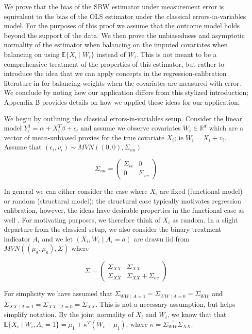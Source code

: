 \documentclass[12pt]{article}
\begin{document}
We prove that the bias of the SBW estimator under measurement error is equivalent to the bias of the OLS estimator under the classical errors-in-variables model. For the purposes of this proof we assume that the outcome model holds beyond the support of the data. We then prove the unbiasedness and asymptotic normality of the estimator when balancing on the imputed covariates when balancing on using $\mathbb{E}\{X_i \mid W_i\}$ instead of $W_i$. This is not meant to be a comprehensive treatment of the properties of this estimator, but rather to introduce the idea that we can apply concepts in the regression-calibration literature in for balancing weights when the covariates are measured with error. We conclude by noting how our application differs from this stylized introduction; Appendix B provides details on how we applied these ideas for our application.

We begin by outlining the classical errors-in-variables setup. Consider the linear model $Y_i^1 = \alpha + X_i^T\beta + \epsilon_i$ and assume we observe covariates $W_i \in \mathbb{R}^d$ which are a vector of mean-unbiased proxies for the true covariate $X_i$; ie $W_i = X_i + v_i$. Assume that $(\epsilon_i, v_i) \sim MVN((0,0), \Sigma_{uu})$ 

$$
\Sigma_{uu} = \begin{pmatrix} 
\Sigma_{\epsilon\epsilon} & 0 \\ 
0 & \Sigma_{vv} 
\end{pmatrix}
$$ 

In general we can either consider the case where $X_i$ are fixed (functional model) or random (structural model); the structural case typically motivates regression calibration, however, the ideas have desirable properties in the functional case as well \cite{gleser1992importance}. For motivating purposes, we therefore think of $X_i$ as random. In a slight departure from the classical setup, we also consider the binary treatment indicator $A_i$ and we let $(X_i, W_i \mid A_i = a)$ are drawn iid from $MVN((\mu_a, \mu_a), \Sigma)$ where 

$$
\Sigma = \begin{pmatrix} 
\Sigma_{XX} & \Sigma_{XX} \\ 
\Sigma_{XX} & \Sigma_{XX} + \Sigma_{vv} 
\end{pmatrix}
$$ 

For simplicity we have assumed that $\Sigma_{WW \mid A = 1} = \Sigma_{WW \mid A = 0} = \Sigma_{WW}$ and $\Sigma_{XX \mid A = 1} = \Sigma_{XX \mid A = 0} = \Sigma_{XX}$. This is not a necessary assumption, but helps simplify notation. By the joint normality of $X_i$ and $W_i$, we know that that $\mathbb{E}\{X_i \mid W_i, A_i = 1\} = \mu_1 + \kappa^T(W_i - \mu_1)$, where $\kappa = \Sigma_{WW}^{-1}\Sigma_{XX}$.
\end{document}
